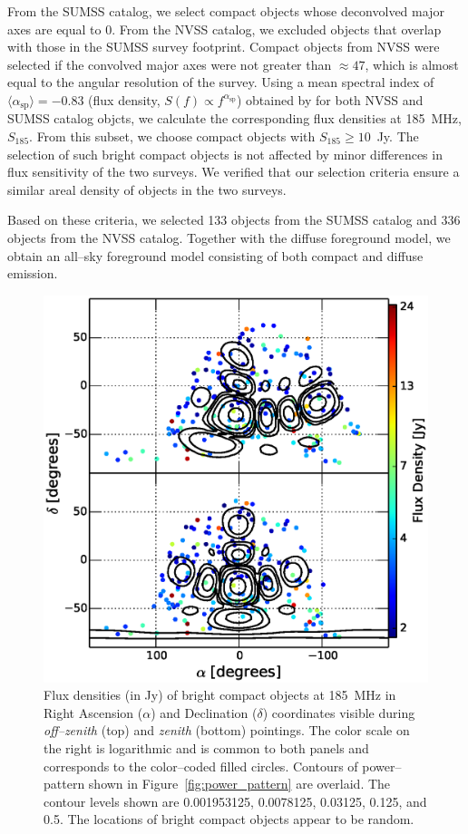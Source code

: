 \documentclass[preprint2,iop,numberedappendix]{emulateapj}
\begin{document}
From the SUMSS catalog, we select compact objects whose deconvolved major axes are equal to 0\arcsec. From the NVSS catalog, we excluded objects that overlap with those in the SUMSS survey footprint. Compact objects from NVSS were selected if the convolved major axes were not greater than $\approx 47$\arcsec, which is almost equal to the angular resolution of the survey. Using a mean spectral index of $\langle\alpha_\textrm{sp}\rangle=-0.83$ (flux density, $S(f)\propto f^{\alpha_\textrm{sp}}$) obtained by \citet{mau03} for both NVSS and SUMSS catalog objcts, we calculate the corresponding flux densities at 185~MHz, $S_{185}$. From this subset, we choose compact objects with $S_{185}\geq 10$~Jy. The selection of such bright compact objects is not affected by minor differences in flux sensitivity of the two surveys. We verified that our selection criteria ensure a similar areal density of objects in the two surveys. 

Based on these criteria, we selected 133 objects from the SUMSS catalog and 336 objects from the NVSS catalog. Together with the diffuse foreground model, we obtain an all--sky foreground model consisting of both compact and diffuse emission.

\begin{figure}[htb]
\centering
\includegraphics[width=\linewidth]{figures/v1_0/csm.eps}
\caption{Flux densities (in Jy) of bright compact objects at 185~MHz in Right Ascension ($\alpha$) and Declination ($\delta$) coordinates visible during {\it off--zenith} (top) and {\it zenith} (bottom) pointings. The color scale on the right is logarithmic and is common to both panels and corresponds to the color--coded filled circles. Contours of power--pattern shown in Figure~\ref{fig:power_pattern} are overlaid. The contour levels shown are 0.001953125, 0.0078125, 0.03125, 0.125, and 0.5. The locations of bright compact objects appear to be random.\label{fig:CSM}}
\end{figure}
\end{document}
